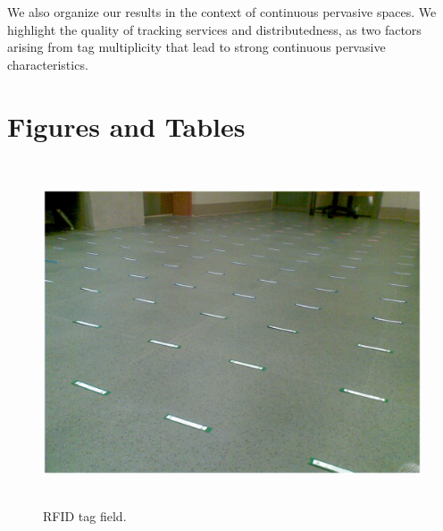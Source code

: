 We also organize our results in the context of continuous pervasive spaces. We highlight the quality of tracking services and distributedness, as two factors arising from tag multiplicity that lead to strong continuous pervasive characteristics.

\section{Figures and Tables}
\begin{figure}
\centering
\includegraphics[width=5.1in, height=4in, viewport = 10 250 400 750, clip]{Chapter_2_Figures/tagfieldpicture.eps} 
\caption{RFID tag field.}
\label{Figure: tagfieldpicture.eps}
\end{figure}
